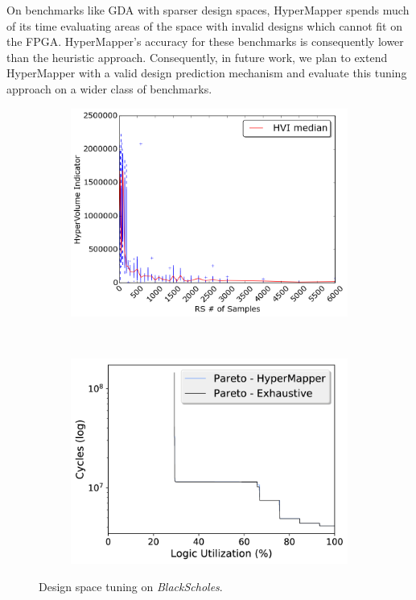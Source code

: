 On benchmarks like GDA with sparser design spaces, HyperMapper spends much of its time evaluating areas
of the space with invalid designs which cannot fit on the FPGA.
HyperMapper's accuracy for these benchmarks is consequently lower than the heuristic approach.
Consequently, in future work, we plan to extend HyperMapper with a valid design prediction mechanism and evaluate this tuning approach on a wider class of benchmarks.


\begin{figure}
\centering
\begin{subfigure}[t]{0.45\linewidth}
\includegraphics[width=\linewidth]{5-compiler/figs/hvi_5NumberSummary_median.png}
\label{hvi_samples}
\end{subfigure}\hspace{15pt}
~
\begin{subfigure}[t]{0.45\linewidth}
\includegraphics[width=\linewidth]{5-compiler/figs/output_pareto_blackscholes.pdf}
\label{paretos}
\end{subfigure}

\vspace{-10pt}
\caption{Design space tuning on \emph{BlackScholes}.}
\label{figHVI}
\end{figure}


